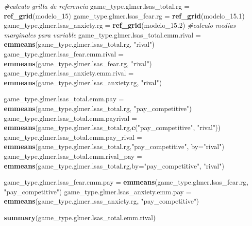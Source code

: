 \documentclass[
]{article}
\newenvironment{Shaded}{\begin{snugshade}}{\end{snugshade}}
\newcommand{\AttributeTok}[1]{\textcolor[rgb]{0.13,0.29,0.53}{#1}}
\newcommand{\CommentTok}[1]{\textcolor[rgb]{0.56,0.35,0.01}{\textit{#1}}}
\newcommand{\FloatTok}[1]{\textcolor[rgb]{0.00,0.00,0.81}{#1}}
\newcommand{\FunctionTok}[1]{\textcolor[rgb]{0.13,0.29,0.53}{\textbf{#1}}}
\newcommand{\NormalTok}[1]{#1}
\newcommand{\OtherTok}[1]{\textcolor[rgb]{0.56,0.35,0.01}{#1}}
\newcommand{\StringTok}[1]{\textcolor[rgb]{0.31,0.60,0.02}{#1}}
\begin{document}
\begin{Shaded}
\begin{Highlighting}[]
\CommentTok{\#calculo grilla de referencia}
\NormalTok{game\_type.glmer.lsas\_total.rg }\OtherTok{=} \FunctionTok{ref\_grid}\NormalTok{(modelo\_15)}
\NormalTok{game\_type.glmer.lsas\_fear.rg }\OtherTok{=} \FunctionTok{ref\_grid}\NormalTok{(modelo\_15}\FloatTok{.1}\NormalTok{)}
\NormalTok{game\_type.glmer.lsas\_anxiety.rg }\OtherTok{=} \FunctionTok{ref\_grid}\NormalTok{(modelo\_15}\FloatTok{.2}\NormalTok{)}
\CommentTok{\#calculo medias marginales para variable}
\NormalTok{game\_type.glmer.lsas\_total.emm.rival }\OtherTok{=} \FunctionTok{emmeans}\NormalTok{(game\_type.glmer.lsas\_total.rg, }\StringTok{"rival"}\NormalTok{)}
\NormalTok{game\_type.glmer.lsas\_fear.emm.rival }\OtherTok{=} \FunctionTok{emmeans}\NormalTok{(game\_type.glmer.lsas\_fear.rg, }\StringTok{"rival"}\NormalTok{)}
\NormalTok{game\_type.glmer.lsas\_anxiety.emm.rival }\OtherTok{=} \FunctionTok{emmeans}\NormalTok{(game\_type.glmer.lsas\_anxiety.rg, }\StringTok{"rival"}\NormalTok{)}

\NormalTok{game\_type.glmer.lsas\_total.emm.pay }\OtherTok{=} \FunctionTok{emmeans}\NormalTok{(game\_type.glmer.lsas\_total.rg, }\StringTok{"pay\_competitive"}\NormalTok{)}
\NormalTok{game\_type.glmer.lsas\_total.emm.payrival }\OtherTok{=} \FunctionTok{emmeans}\NormalTok{(game\_type.glmer.lsas\_total.rg,}\FunctionTok{c}\NormalTok{(}\StringTok{"pay\_competitive"}\NormalTok{, }\StringTok{"rival"}\NormalTok{))}
\NormalTok{game\_type.glmer.lsas\_total.emm.pay\_rival }\OtherTok{=} \FunctionTok{emmeans}\NormalTok{(game\_type.glmer.lsas\_total.rg,}\StringTok{"pay\_competitive"}\NormalTok{, }\AttributeTok{by=}\StringTok{"rival"}\NormalTok{)}
\NormalTok{game\_type.glmer.lsas\_total.emm.rival\_pay }\OtherTok{=} \FunctionTok{emmeans}\NormalTok{(game\_type.glmer.lsas\_total.rg,}\AttributeTok{by=}\StringTok{"pay\_competitive"}\NormalTok{, }\StringTok{"rival"}\NormalTok{)}

\NormalTok{game\_type.glmer.lsas\_fear.emm.pay }\OtherTok{=} \FunctionTok{emmeans}\NormalTok{(game\_type.glmer.lsas\_fear.rg, }\StringTok{"pay\_competitive"}\NormalTok{)}
\NormalTok{game\_type.glmer.lsas\_anxiety.emm.pay }\OtherTok{=} \FunctionTok{emmeans}\NormalTok{(game\_type.glmer.lsas\_anxiety.rg, }\StringTok{"pay\_competitive"}\NormalTok{)}

\FunctionTok{summary}\NormalTok{(game\_type.glmer.lsas\_total.emm.rival)}
\end{Highlighting}
\end{Shaded}
\end{document}
